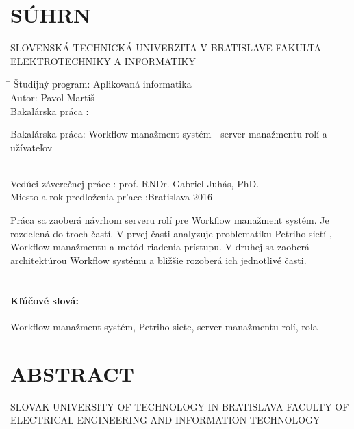 \documentclass[12pt, oneside]{book}
\def\mfautor{Pavol Martiš}
\begin{document}
\section*{\fontsize{22pt}{1.3}\selectfont S\'{U}HRN}
\noindent SLOVENSKÁ TECHNICKÁ UNIVERZITA V BRATISLAVE
\newline
FAKULTA ELEKTROTECHNIKY A INFORMATIKY \\
\begin{tabbing}	
	\hspace*{7cm}\= \kill
	\v{S}tudijný 	program:\> Aplikovaná informatika\\
	Autor:\> \mfautor\\
	Bakalárska práca  :\>
	\begin{minipage}[t]{20em}
		Bakalárska práca: Workflow manažment systém - server manažmentu rolí a užívateľov
	\end{minipage} \\
	Vedúci záverečnej práce :\> prof. RNDr. Gabriel Juhás, PhD.\\
	
	Miesto a rok predlo\v{z}enia pr\a'ace :\>Bratislava 2016
\end{tabbing}
Práca sa zaoberá návrhom serveru rolí pre Workflow manažment systém. Je rozdelená do troch častí. V prvej časti analyzuje problematiku Petriho sietí , Workflow manažmentu a metód riadenia prístupu. V druhej sa zaoberá architektúrou Workflow systému a bližšie rozoberá ich jednotlivé časti.
\\ \\
\paragraph*{Kľúčové slová:} 
 Workflow manažment systém, Petriho siete, server manažmentu rolí, rola

\newpage
\pagestyle{empty}	
\section*{\fontsize{21pt}{1.3}\selectfont ABSTRACT}
 
	\noindent SLOVAK UNIVERSITY OF TECHNOLOGY IN BRATISLAVA
	\newline
	{\fontsize{11pt}{1.3}\selectfont FACULTY OF ELECTRICAL ENGINEERING AND INFORMATION TECHNOLOGY\\ }
	
\end{document}
